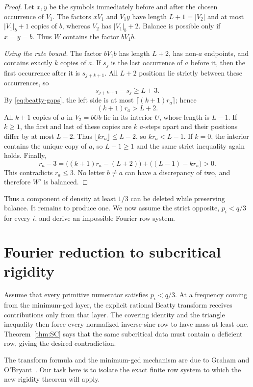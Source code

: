 \documentclass[11pt]{article}
\theoremstyle{definition}
\theoremstyle{remark}
\begin{document}
\begin{proof}
Let \(x,y\) be the symbols immediately before and after the chosen
occurrence of \(V_1\).  The factors \(xV_1\) and \(V_1y\) have length
\(L+1=|V_2|\) and at most \(|V_1|_b+1\) copies of \(b\), whereas \(V_2\)
has \(|V_1|_b+2\).  Balance is possible only if \(x=y=b\).  Thus \(W\)
contains the factor \(bV_1b\).

\smallskip
\noindent\emph{Using the rate bound.}
The factor \(bV_1b\) has length \(L+2\), has non-\(a\) endpoints, and
contains exactly \(k\) copies of \(a\).  If \(s_j\) is the last occurrence
of \(a\) before it, then the first occurrence after it is \(s_{j+k+1}\).
All \(L+2\) positions lie strictly between these occurrences, so
\[
 s_{j+k+1}-s_j\ge L+3.
\]
By \eqref{eq:beatty-gaps}, the left side is at most
\(\lceil(k+1)r_a\rceil\); hence
\[
 (k+1)r_a>L+2.
\]
All \(k+1\) copies of \(a\) in \(V_2=bUb\) lie in its interior \(U\),
whose length is \(L-1\).  If \(k\ge1\), the first and last of these copies
are \(k\) \(a\)-steps apart and their positions differ by at most \(L-2\).
Thus \(\lfloor kr_a\rfloor\le L-2\), so \(kr_a<L-1\).  If \(k=0\), the
interior contains the unique copy of \(a\), so \(L-1\ge1\) and the same
strict inequality again holds.  Finally,
\[
 r_a-3=\bigl((k+1)r_a-(L+2)\bigr)
       +\bigl((L-1)-kr_a\bigr)>0.
\]
This contradicts \(r_a\le3\).  No letter \(b\ne a\) can have a discrepancy
of two, and therefore \(W'\) is balanced.
\end{proof}

Thus a component of density at least \(1/3\) can be deleted while preserving
balance.  It remains to produce one.  We now assume the strict opposite,
\(p_i<q/3\) for every \(i\), and derive an impossible Fourier row system.

\section{Fourier reduction to subcritical rigidity}\label{sec:fourier}

Assume that every primitive numerator satisfies \(p_i<q/3\).  At a frequency
coming from the minimum-gcd layer, the explicit rational Beatty transform
receives contributions only from that layer.  The covering identity and the
triangle inequality then force every normalized inverse-sine row to have
mass at least one.  Theorem~\ref{thm:SC} says that the same subcritical data
must contain a deficient row, giving the desired contradiction.

The transform formula and the minimum-gcd mechanism are due to Graham and
O'Bryant~\cite[Theorem~1.1 and Section~4.2, especially
Lemma~4.5]{GrahamOBryant2005}.  Our task here is to isolate the exact finite
row system to which the new rigidity theorem will apply.
\end{document}
